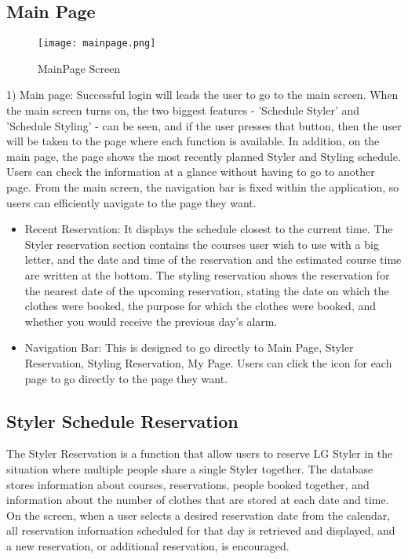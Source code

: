 \documentclass[conference]{IEEEtran}
\begin{document}
\subsection{Main Page}
\begin{figure}[htbp]
\centerline{\texttt{[image: mainpage.png]}}
\caption{MainPage Screen}
\label{fig}
\end{figure}
1) Main page: Successful login will leads the user to go to the main screen. When the main screen turns on, the two biggest features - 'Schedule Styler' and 'Schedule Styling' - can be seen, and if the user presses that button, then the user will be taken to the page where each function is available.
In addition, on the main page, the page shows the most recently planned Styler and Styling schedule. Users can check the information at a glance without having to go to another page.
From the main screen, the navigation bar is fixed within the application, so users can efficiently navigate to the page they want.\\

\newpage
\begin{itemize}
    \item Recent Reservation: It displays the schedule closest to the current time. The Styler reservation section contains the courses user wish to use with a big letter, and the date and time of the reservation and the estimated course time are written at the bottom. The styling reservation shows the reservation for the nearest date of the upcoming reservation, stating the date on which the clothes were booked, the purpose for which the clothes were booked, and whether you would receive the previous day's alarm.\\
    \item Navigation Bar: This is designed to go directly to Main Page, Styler Reservation, Styling Reservation, My Page. Users can click the icon for each page to go directly to the page they want.\\
\end{itemize}

\subsection{Styler Schedule Reservation}
The Styler Reservation is a function that allow users to reserve LG Styler in the situation where multiple people share a single Styler together. The database stores information about courses, reservations, people booked together, and information about the number of clothes that are stored at each date and time. On the screen, when a user selects a desired reservation date from the calendar, all reservation information scheduled for that day is retrieved and displayed, and a new reservation, or additional reservation, is encouraged.\\
\end{document}
